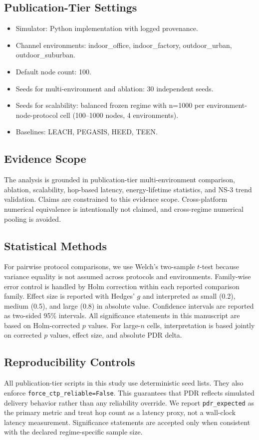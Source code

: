 \documentclass[sensors,article,submit,moreauthors,pdftex]{Definitions/mdpi}
\begin{document}
\subsection{Publication-Tier Settings}
\begin{itemize}
\item Simulator: Python implementation with logged provenance.
\item Channel environments: indoor\_office, indoor\_factory, outdoor\_urban, outdoor\_suburban.
\item Default node count: 100.
\item Seeds for multi-environment and ablation: 30 independent seeds.
\item Seeds for scalability: balanced frozen regime with n=1000 per environment-node-protocol cell (100--1000 nodes, 4 environments).
\item Baselines: LEACH, PEGASIS, HEED, TEEN.
\end{itemize}

\subsection{Evidence Scope}
The analysis is grounded in publication-tier multi-environment comparison, ablation, scalability, hop-based latency, energy-lifetime statistics, and NS-3 trend validation. Claims are constrained to this evidence scope. Cross-platform numerical equivalence is intentionally not claimed, and cross-regime numerical pooling is avoided.

\subsection{Statistical Methods}
For pairwise protocol comparisons, we use Welch's two-sample $t$-test because variance equality is not assumed across protocols and environments. Family-wise error control is handled by Holm correction within each reported comparison family. Effect size is reported with Hedges' $g$ and interpreted as small (0.2), medium (0.5), and large (0.8) in absolute value. Confidence intervals are reported as two-sided 95\% intervals. All significance statements in this manuscript are based on Holm-corrected $p$ values. For large-$n$ cells, interpretation is based jointly on corrected $p$ values, effect size, and absolute PDR delta.

\subsection{Reproducibility Controls}
All publication-tier scripts in this study use deterministic seed lists. They also enforce \texttt{force\_ctp\_reliable=False}. This guarantees that PDR reflects simulated delivery behavior rather than any reliability override. We report \texttt{pdr\_expected} as the primary metric and treat hop count as a latency proxy, not a wall-clock latency measurement. Significance statements are accepted only when consistent with the declared regime-specific sample size.
\end{document}
